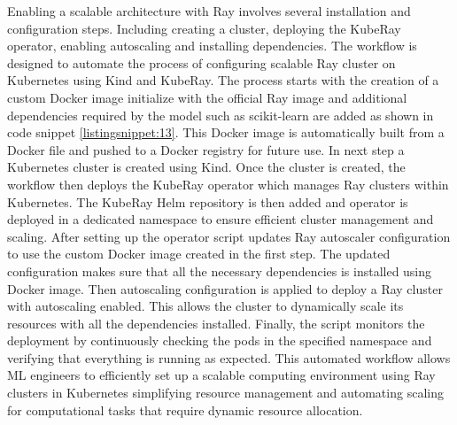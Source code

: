 Enabling a scalable architecture with Ray involves several installation and configuration steps. Including creating a cluster, deploying the KubeRay operator, enabling autoscaling and installing dependencies. The workflow is designed to automate the process of configuring scalable Ray cluster on Kubernetes using Kind and KubeRay. The process starts with the creation of a custom Docker image initialize with the official Ray image and additional dependencies required by the model such as scikit-learn are added as shown in code snippet \autoref{listingsnippet:13}. This Docker image is automatically built from a Docker file and pushed to a Docker registry for future use. In next step a Kubernetes cluster is created using Kind. Once the cluster is created, the workflow then deploys the KubeRay operator which manages Ray clusters within Kubernetes. The KubeRay Helm repository is then added and operator is deployed in a dedicated namespace to ensure efficient cluster management and scaling. After setting up the operator script updates Ray autoscaler configuration to use the custom Docker image created in the first step. The updated configuration makes sure that all the necessary dependencies is installed using Docker image. Then autoscaling configuration is applied to deploy a Ray cluster with autoscaling enabled. This allows the cluster to dynamically scale its resources with all the dependencies installed. Finally, the script monitors the deployment by continuously checking the pods in the specified namespace and verifying that everything is running as expected. This automated workflow allows ML engineers to efficiently set up a scalable computing environment using Ray clusters in Kubernetes simplifying resource management and automating scaling for computational tasks that require dynamic resource allocation.


